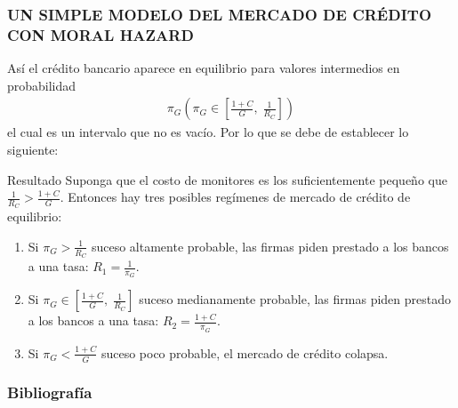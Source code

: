 \documentclass[10pt, xcolor=table, x11names]{beamer}
\begin{document}
\begin{frame}
    \frametitle{{\normalsize UN SIMPLE MODELO DEL MERCADO DE CRÉDITO CON MORAL HAZARD} {}}
   Así el crédito bancario aparece en equilibrio para valores intermedios en probabilidad
    \begin{align}
    \pi_{G}(\pi_{G} \in \left[\frac{1+C}{G},\; \frac{1}{R_{C}}\right] )\nonumber
    \end{align} 
    el cual es un intervalo que no es vacío. Por lo que se debe de establecer lo siguiente:
\begin{block} {Resultado} 
    Suponga que el costo de monitores es los suficientemente pequeño que $\frac{1}{R_{C}}>\frac{1+C}{G} $. Entonces hay tres posibles regímenes de mercado de crédito de equilibrio:
\begin{enumerate}
    \item Si $\pi_{G}>\frac{1}{R_{C}}$ suceso altamente probable, las firmas piden prestado a los bancos a una tasa: $R_{1}=\frac{1}{\pi_{G}}$.
    \item  Si $\pi_{G}\in \left[\frac{1+C}{G},\; \frac{1}{R_{C}}\right] $ suceso medianamente probable, las firmas piden prestado a los bancos a una tasa: $R_{2}=\frac{1+C}{\pi_{G}}$. 
    \item  Si $\pi_{G} < \frac{1+C}{G} $ suceso poco probable, el mercado de crédito colapsa.
\end{enumerate}    
\end{block}    

\end{frame}


	\begin{frame}[allowframebreaks]
    \frametitle{{\large 
            Bibliografía}}
    \renewcommand{\refname}{Referencias}
    
    
\end{frame}
\end{document}
